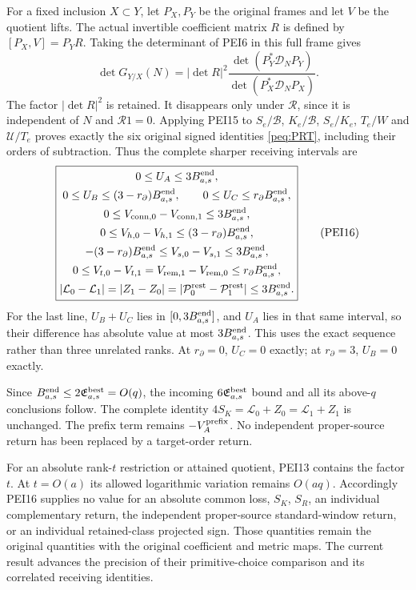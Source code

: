 \documentclass[11pt,a4paper]{article}
\begin{document}
For a fixed inclusion $X\subset Y$, let $P_X,P_Y$ be the original
frames and let $V$ be the quotient lifts. The actual invertible
coefficient matrix $R$ is defined by $[P_X,V]=P_YR$.
Taking the determinant of PEI6 in this full frame gives
\[
 \det G_{Y/X}(N)=|\det R|^2
   \frac{\det(P_Y^*\mathcal D_NP_Y)}
        {\det(P_X^*\mathcal D_NP_X)}.                            \tag{PEI15}
\]
The factor $|\det R|^2$ is retained. It disappears only under
$\mathcal R$, since it is independent of $N$ and $\mathcal R1=0$.
Applying PEI15 to $S_e/\mathscr B$, $K_e/\mathscr B$,
$S_e/K_e$, $T_e/W$ and $\mathcal U/T_e$ proves exactly the
six original signed identities \eqref{peq:PRT}, including their
orders of subtraction. Thus the complete sharper receiving intervals are
\[
 \boxed{\begin{gathered}
 0\le U_A\le3B^{\rm end}_{a,s},\\
 0\le U_B\le(3-r_\partial)B^{\rm end}_{a,s},\qquad
 0\le U_C\le r_\partial B^{\rm end}_{a,s},\\
 0\le V_{{\rm conn},0}-V_{{\rm conn},1}\le3B^{\rm end}_{a,s},\\
 0\le V_{h,0}-V_{h,1}\le(3-r_\partial)B^{\rm end}_{a,s},\\
 -(3-r_\partial)B^{\rm end}_{a,s}
       \le V_{s,0}-V_{s,1}\le3B^{\rm end}_{a,s},\\
 0\le V_{t,0}-V_{t,1}
      =V_{{\rm rem},1}-V_{{\rm rem},0}
      \le r_\partial B^{\rm end}_{a,s},\\
 |\mathcal L_0-\mathcal L_1|
   =|Z_1-Z_0|
   =|\mathcal P^{\rm rest}_0-\mathcal P^{\rm rest}_1|
   \le3B^{\rm end}_{a,s}.
 \end{gathered}}                                                 \tag{PEI16}
\]
For the last line, $U_B+U_C$ lies in $[0,3B^{\rm end}_{a,s}]$,
and $U_A$ lies in that same interval, so their difference has
absolute value at most $3B^{\rm end}_{a,s}$. This uses the exact
sequence rather than three unrelated ranks. At $r_\partial=0$,
$U_C=0$ exactly; at $r_\partial=3$, $U_B=0$ exactly.

Since $B^{\rm end}_{a,s}\le2\mathfrak E^{\rm best}_{a,s}=O(q)$,
the incoming $6\mathfrak E^{\rm best}_{a,s}$ bound and all its
above-$q$ conclusions follow. The complete identity
$4S_K=\mathcal L_0+Z_0=\mathcal L_1+Z_1$ is unchanged.
The prefix term remains $-V_A^{\rm prefix}$. No independent
proper-source return has been replaced by a target-order return.

For an absolute rank-$t$ restriction or attained quotient, PEI13
contains the factor $t$. At $t=O(a)$ its allowed logarithmic
variation remains $O(aq)$. Accordingly PEI16 supplies no value
for an absolute common loss, $S_K$, $S_R$, an individual complementary
return, the independent proper-source standard-window return, or an
individual retained-class projected sign. Those quantities remain
the original quantities with the original coefficient and metric maps.
The current result advances the precision of their primitive-choice
comparison and its correlated receiving identities.
\end{document}
